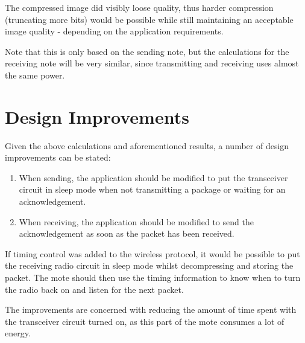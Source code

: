 The compressed image did visibly loose quality, thus harder compression (truncating more bits) would be possible while still maintaining an acceptable image quality - depending on the application requirements. 

Note that this is only based on the sending note, but the calculations for the receiving note will be very similar, since transmitting and receiving uses almost the same power.

\section{Design Improvements}

Given the above calculations and aforementioned results, a number of design improvements can be stated: 

\begin{enumerate}
\item When sending, the application should be modified to put the transceiver circuit in sleep mode when not transmitting a package or waiting for an acknowledgement. 
\item When receiving, the application should be modified to send the acknowledgement as soon as the packet has been received. 
\end{enumerate} 

If timing control was added to the wireless protocol, it would be possible to put the receiving radio circuit in sleep mode whilst decompressing and storing the packet. The mote should then use the timing information to know when to turn the radio back on and listen for the next packet.

The improvements are concerned with reducing the amount of time spent with the transceiver circuit turned on, as this part of the mote consumes a lot of energy.   

